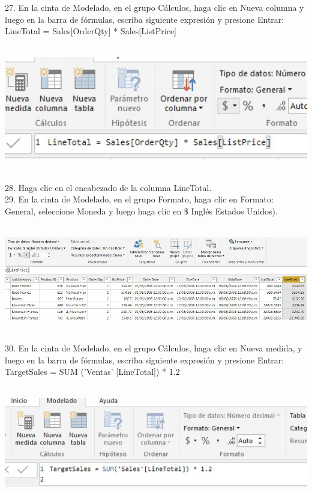 \begin{flushleft}
\begin{itemize}
27. En la cinta de Modelado, en el grupo Cálculos, haga clic en Nueva columna y luego en la barra de fórmulas, escriba
siguiente expresión y presione Entrar: LineTotal = Sales[OrderQty] * Sales[ListPrice]\\
\textbf{ }\\
\begin{center}
	\includegraphics[width=16cm]{./Imagenes/image23} 
	\end{center}
\textbf{ }\\

28. Haga clic en el encabezado de la columna LineTotal.\\
29. En la cinta de Modelado, en el grupo Formato, haga clic en Formato: General, seleccione Moneda y luego haga clic en \$
Inglés Estados Unidos).\\
\textbf{ }\\
\begin{center}
	\includegraphics[width=16cm]{./Imagenes/image24} 
	\end{center}
\textbf{ }\\

30. En la cinta de Modelado, en el grupo Cálculos, haga clic en Nueva medida, y luego en la barra de fórmulas, escriba
siguiente expresión y presione Entrar:
TargetSales = SUM ('Ventas' [LineTotal]) * 1.2\\
\textbf{ }\\
\begin{center}
	\includegraphics[width=16cm]{./Imagenes/image25} 
	\end{center}
\textbf{ }\\


\end{itemize}
\end{flushleft}
